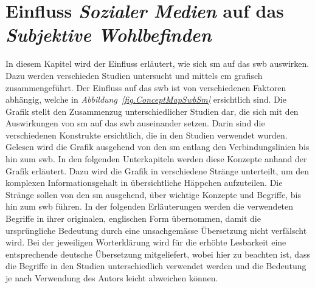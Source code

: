 %
%
\thispagestyle{empty}
\chapter{Einfluss \textit{Sozialer Medien} auf das \textit{Subjektive Wohlbefinden}}\label{chap.einfluss}
In diesem Kapitel wird der Einfluss erläutert, wie sich \gls{sm} auf das \gls{swb} auswirken. Dazu werden verschieden Studien untersucht und mittels \gls{cm} grafisch zusammengeführt. Der Einfluss auf das \gls{swb} ist von verschiedenen Faktoren abhängig, welche in \textit{Abbildung~\ref{fig.ConceptMapSwbSm}} ersichtlich sind.\newline
Die Grafik stellt den Zusammenzug unterschiedlicher Studien dar, die sich mit den Auswirkungen von \gls{sm} auf das \gls{swb} auseinander setzen. Darin sind die verschiedenen Konstrukte ersichtlich, die in den Studien verwendet wurden. Gelesen wird die Grafik ausgehend von den \gls{sm} entlang den Verbindungslinien bis hin zum \gls{swb}.\newline
In den folgenden Unterkapiteln werden diese Konzepte anhand der Grafik erläutert. Dazu wird die Grafik in verschiedene Stränge unterteilt, um den komplexen Informationsgehalt in übersichtliche Häppchen aufzuteilen. Die Stränge sollen von den \gls{sm} ausgehend, über wichtige Konzepte und Begriffe, bis hin zum \gls{swb} führen. \newline
In der folgenden Erläuterungen werden die verwendeten Begriffe in ihrer originalen, englischen Form übernommen, damit die ursprüngliche Bedeutung durch eine unsachgemässe Übersetzung nicht verfälscht wird. Bei der jeweiligen Worterklärung wird für die erhöhte Lesbarkeit eine entsprechende deutsche Übersetzung mitgeliefert, wobei hier zu beachten ist, dass die Begriffe in den Studien unterschiedlich verwendet werden und die Bedeutung je nach Verwendung des Autors leicht abweichen können.\newline


